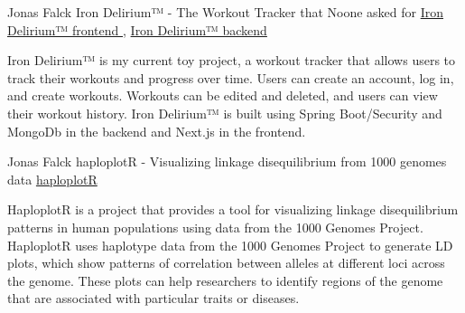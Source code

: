 

\begin{cventries}
\cventry
  {Jonas Falck}
  { Iron Delirium™ - The Workout Tracker that Noone asked for } %
  {
  \href{ https://github.com/joe-nas/workout-app-frontend-next }{ Iron Delirium™ frontend },
  \href{ https://github.com/joe-nas/workout-app }{ Iron Delirium™ backend }
  }
  {} %
  {    
  \begin{cvitems} %
    \item { Iron Delirium™ is my current toy project, a workout tracker that allows users to track their workouts and progress over time. Users can create an account, log in, and create workouts. Workouts can be edited and deleted, and users can view their workout history. Iron Delirium™ is built using Spring Boot/Security and MongoDb in the backend and Next.js in the frontend. }
  \end{cvitems}
  }
 \cventry
  {Jonas Falck}
  { haploplotR - Visualizing linkage disequilibrium from 1000 genomes data } %
  {
  \href{ https://github.com/joe-nas/haploplotR }{ haploplotR }
  }
  {} %
  {    
  \begin{cvitems} %
    \item { HaploplotR is a project that provides a tool for visualizing linkage disequilibrium patterns in human populations using data from the 1000 Genomes Project. HaploplotR uses haplotype data from the 1000 Genomes Project to generate LD plots, which show patterns of correlation between alleles at different loci across the genome. These plots can help researchers to identify regions of the genome that are associated with particular traits or diseases. }
  \end{cvitems}
  }
\end{cventries}